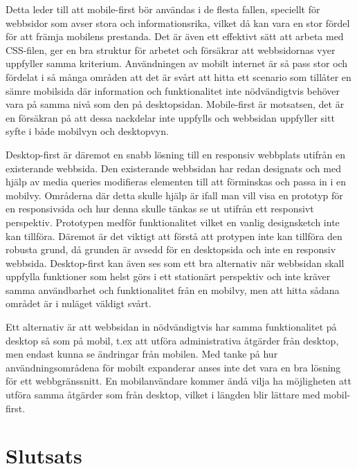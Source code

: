 \documentclass[11pt]{article}
\begin{document}
Detta leder till att mobile-first bör användas i de flesta fallen, speciellt för webbsidor som avser stora och informationsrika, vilket då kan vara en stor fördel för att främja mobilens prestanda. Det är även ett effektivt sätt att arbeta med CSS-filen, ger en bra struktur för arbetet och försäkrar att webbsidornas vyer uppfyller samma kriterium. Användningen av mobilt internet är så pass stor och fördelat i så många områden att det är svårt att hitta ett scenario som tillåter en sämre mobilsida där information och funktionalitet inte nödvändigtvis behöver vara på samma nivå som den på desktopsidan. Mobile-first är motsatsen, det är en försäkran på att dessa nackdelar inte uppfylls och webbsidan uppfyller sitt syfte i både mobilvyn och desktopvyn. 

Desktop-first är däremot en snabb lösning till en responsiv webbplats utifrån en existerande webbsida. Den existerande webbsidan har redan designats och med hjälp av media queries modifieras elementen till att förminskas och passa in i en mobilvy. Områderna där detta skulle hjälp är ifall man vill visa en prototyp för en responsivsida och hur denna skulle tänkas se ut utifrån ett responsivt perspektiv. Prototypen medför funktionalitet vilket en vanlig designsketch inte kan tillföra. Däremot är det viktigt att förstå att protypen inte kan tillföra den robusta grund, då grunden är avsedd för en desktopsida och inte en responsiv webbsida. Desktop-first kan även ses som ett bra alternativ när webbsidan skall uppfylla funktioner som helst görs i ett stationärt perspektiv och inte kräver samma användbarhet och funktionalitet från en mobilvy, men att hitta sådana området är i nuläget väldigt svårt. 

Ett alternativ är att webbsidan in nödvändigtvis har samma funktionalitet på desktop så som på mobil, t.ex att utföra administrativa åtgärder från desktop, men endast kunna se ändringar från mobilen.
Med tanke på hur användningsområdena för mobilt expanderar anses inte det vara en bra lösning för ett webbgränssnitt. En mobilanvändare kommer ändå vilja ha möjligheten att utföra samma åtgärder som från desktop, vilket i längden blir lättare med mobil-first.

\section{Slutsats}





\printbibliography
\end{document}
